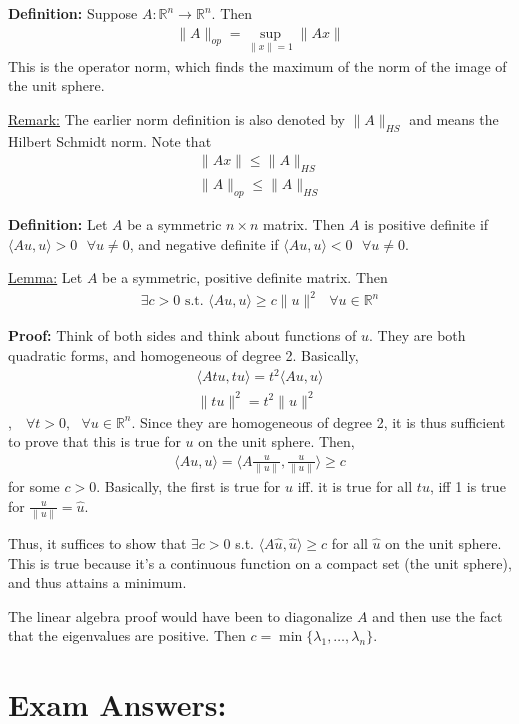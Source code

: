 \documentclass{article}
\newcommand*{\txt}[1]{\text{ #1 }}%
\newcommand*{\iprod}[1]{\langle #1 \rangle}
\newcommand*{\fora}{\txt{}\forall}%
\newcommand*{\rr}{\mathbb{R}}%
\begin{document}
\textbf{Definition:} Suppose $A:\rr^n\to \rr^n$. Then \begin{align*}
    \|A\|_{op}=\sup_{\|x\|=1}\|Ax\|
\end{align*} This is the operator norm, which finds the maximum of the norm of the image of the unit sphere.

\underline{Remark:} The earlier norm definition is also denoted by $\|A\|_{HS}$ and means the Hilbert Schmidt norm. Note that \begin{align*}
    \|Ax\|\leq \|A\|_{HS}\\
    \|A\|_{op}\leq \|A\|_{HS}
\end{align*}

\textbf{Definition:} Let $A$ be a symmetric $n\times n$ matrix. Then $A$ is positive definite if $\iprod{Au,u}>0\fora u\neq 0$, and negative definite if $\iprod{Au,u}<0\fora u\neq 0$.

\underline{Lemma:} Let $A$ be a symmetric, positive definite matrix. Then \begin{align*}
    \exists c>0\txt{s.t.}\iprod{Au,u}\geq c\|u\|^2\fora u\in \rr^n
\end{align*}

\textbf{Proof:} Think of both sides and think about functions of $u$. They are both quadratic forms, and homogeneous of degree 2. Basically, \begin{align*}
    \iprod{Atu,tu}=t^2\iprod{Au,u}\\
    \|tu\|^2=t^2\|u\|^2
\end{align*}, $\fora t>0, \fora u\in \rr^n$. Since they are homogeneous of degree 2, it is thus sufficient to prove that this is true for $u$ on the unit sphere. Then, \begin{align*}
    \iprod{Au,u}=\iprod{A\frac{u}{\|u\|},\frac{u}{\|u\|}}\geq c
\end{align*} for some $c>0$. Basically, the first is true for $u$ iff. it is true for all $tu$, iff 1 is true for $\frac{u}{\|u\|}=\hat{u}$. 

Thus, it suffices to show that $\exists c>0$ s.t. $\iprod{A\hat{u},\hat{u}}\geq c$ for all $\hat{u}$ on the unit sphere. This is true because it's a continuous function on a compact set (the unit sphere), and thus attains a minimum.

The linear algebra proof would have been to diagonalize $A$ and then use the fact that the eigenvalues are positive. Then $c=\min\{\lambda_1,\dots,\lambda_n\}$.

\section{Exam Answers:}
\end{document}
